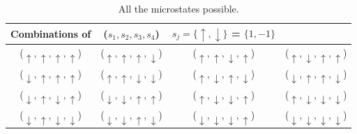 \documentclass[12pt]{article}
\begin{document}
\begin{table}
\begin{center}
	\begin{tabular}{c c c c}
	Combinations of & ($s_1, s_2, s_3, s_4$)& $s_j = \lbrace \uparrow, \downarrow \rbrace$  = $\lbrace 1, -1 \rbrace$ &\\
	\hline 
	($\uparrow , \uparrow, \uparrow, \uparrow$) & 
	($\uparrow , \uparrow, \uparrow, \downarrow$) & 
	($\uparrow , \uparrow, \downarrow, \uparrow$)  & 
	($\uparrow , \downarrow, \uparrow, \uparrow$) \\
	($\downarrow , \uparrow, \uparrow, \uparrow$)& ($\uparrow, \uparrow, \downarrow, \downarrow$) & ($\uparrow, \downarrow, \uparrow, \downarrow$) & ($\downarrow, \uparrow, \uparrow, \downarrow$) \\
	($\downarrow, \uparrow, \downarrow, \uparrow$)& ($\downarrow, \downarrow, \uparrow, \uparrow$) & ($\uparrow, \downarrow, \downarrow, \uparrow$) & ($\uparrow, \downarrow, \downarrow, \downarrow$) \\
	($\downarrow, \uparrow, \downarrow, \downarrow$) & ($\downarrow, \downarrow, \uparrow, \downarrow$) & ($\downarrow, \downarrow, \downarrow, \uparrow$) & ($\downarrow, \downarrow, \downarrow, \downarrow$) \\
	\hline
	\end{tabular}
\caption{All the microstates possible.}
\label{table:All_microstates}
\end{center}
\end{table}
\end{document}
